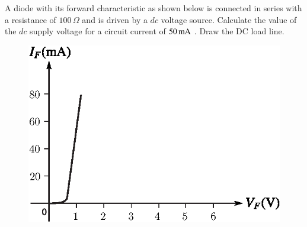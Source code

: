 \medskip
\begin{example}\label{exam1.18}
A diode with its forward characteristic as shown below is connected in
series with a resistance of $100\,\Omega$ and is driven by a $dc$
voltage source. Calculate the value of the $dc$ supply voltage for a
circuit current of $50\operatorname{mA}$ . Draw the DC load line.
\begin{figure}[H]
\centering
\includegraphics[scale=.85]{chap1/exp1.18.eps}
\end{figure}
\end{example}

